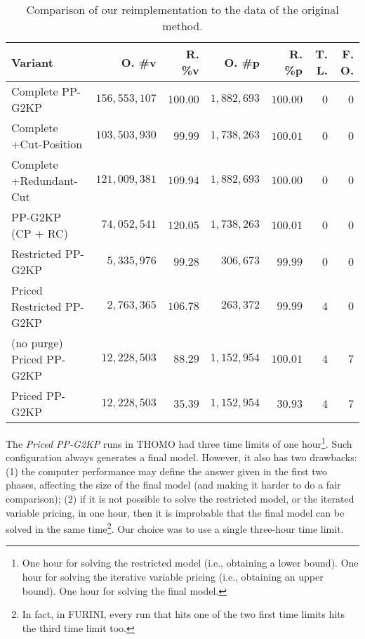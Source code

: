 \documentclass[smallextended]{svjour3}       %
\begin{document}
\begin{table}
\caption{Comparison of our reimplementation to the data of the original method.}
\begin{tabular}{lrrrrrr}
\hline\hline
\textbf{Variant} & \textbf{O. \#v} & \textbf{R. \%v} & \textbf{O. \#p} & \textbf{R. \%p} & \textbf{T. L.} & \textbf{F. O.} \\\hline
Complete PP-G2KP & \(156,553,107\) & \(100.00\) & \(1,882,693\) & \(100.00\) & \(0\) & \(0\)\\
Complete +Cut-Position & \(103,503,930\) & \(99.99\) & \(1,738,263\) & \(100.01\)  & \(0\) & \(0\)\\
Complete +Redundant-Cut & \(121,009,381\) & \(109.94\) & \(1,882,693\) & \(100.00\) & \(0\) & \(0\)\\
PP-G2KP (CP + RC) & \(74,052,541\) & \(120.05\) & \(1,738,263\) & \(100.01\) & \(0\) & \(0\)\\
Restricted PP-G2KP & \(5,335,976\) & \(99.28\) & \(306,673\) & \(99.99\) & \(0\) & \(0\)\\
Priced Restricted PP-G2KP & \(2,763,365\) & \(106.78\) & \(263,372\) & \(99.99\) & \(4\) & \(0\)\\
(no purge) Priced PP-G2KP & \(12,228,503\) & \(88.29\) & \(1,152,954\) & \(100.01\) & \(4\) & \(7\)\\
Priced PP-G2KP & \(12,228,503\) & \(35.39\) & \(1,152,954\) & \(30.93\) & \(4\) & \(7\)\\
\hline\hline
\end{tabular}
\label{tab:reimplementation_comparison}
\end{table}

The \emph{Priced PP-G2KP} runs in THOMO had three time limits of one hour\footnote{
One hour for solving the restricted model (i.e., obtaining a lower bound).
One hour for solving the iterative variable pricing (i.e., obtaining an upper bound).
One hour for solving the final model.
}.
Such configuration always generates a final model.
However, it also has two drawbacks:
(1) the computer performance may define the answer given in the first two phases, affecting the size of the final model (and making it harder to do a fair comparison);
(2) if it is not possible to solve the restricted model, or the iterated variable pricing, in one hour, then it is improbable that the final model can be solved in the same time\footnote{In fact, in FURINI, every run that hits one of the two first time limits hits the third time limit too.}.
Our choice was to use a single three-hour time limit.
\end{document}
